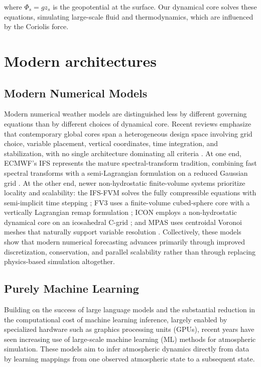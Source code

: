 \noindent where $\Phi_s = g z_s$ is the geopotential at the surface. Our dynamical core solves these equations, simulating large-scale fluid and thermodynamics, which are influenced by the Coriolis force.

\section{Modern architectures}


\subsection{Modern Numerical Models}

Modern numerical weather models are distinguished less by different governing equations than by different choices of dynamical core. Recent reviews emphasize that contemporary global cores span a heterogeneous design space involving grid choice, variable placement, vertical coordinates, time integration, and stabilization, with no single architecture dominating all criteria \cite{Ullrich2017}. At one end, ECMWF's IFS represents the mature spectral-transform tradition, combining fast spectral transforms with a semi-Lagrangian formulation on a reduced Gaussian grid \cite{ECMWFIFS2024}. At the other end, newer non-hydrostatic finite-volume systems prioritize locality and scalability: the IFS-FVM solves the fully compressible equations with semi-implicit time stepping \cite{Kuehnlein2019}; FV3 uses a finite-volume cubed-sphere core with a vertically Lagrangian remap formulation \cite{Harris2021}; ICON employs a non-hydrostatic dynamical core on an icosahedral C-grid \cite{Zangl2015}; and MPAS uses centroidal Voronoi meshes that naturally support variable resolution \cite{Skamarock2012}. Collectively, these models show that modern numerical forecasting advances primarily through improved discretization, conservation, and parallel scalability rather than through replacing physics-based simulation altogether.

\subsection{Purely Machine Learning}

Building on the success of large language models and the substantial reduction in the computational cost of machine learning inference, largely enabled by specialized hardware such as graphics processing units (GPUs), recent years have seen increasing use of large-scale machine learning (ML) methods for atmospheric simulation. These models aim to infer atmospheric dynamics directly from data by learning mappings from one observed atmospheric state to a subsequent state.


